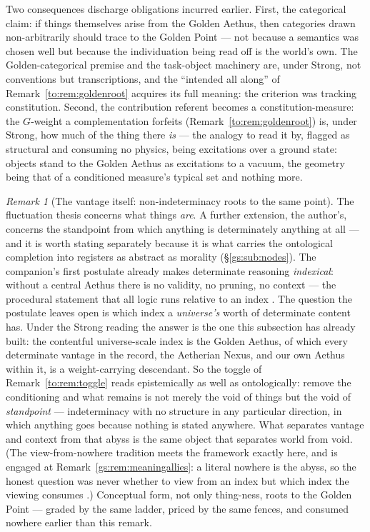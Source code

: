 \documentclass[11pt]{article}
\numberwithin{equation}{section}
\theoremstyle{plain}
\theoremstyle{definition}
\theoremstyle{remark}
\newtheorem{remark}[theorem]{Remark}
\begin{document}
Two consequences discharge obligations incurred earlier. First, the
categorical claim: if things themselves arise from the Golden Aethus,
then categories drawn non-arbitrarily should trace to the Golden Point
--- not because a semantics was chosen well but because the
individuation being read off is the world's own. The
Golden-categorical premise and the task-object machinery are, under
Strong, not conventions but transcriptions, and the ``intended all
along'' of Remark~\ref{to:rem:goldenroot} acquires its full meaning:
the criterion was tracking constitution. Second, the contribution
referent becomes a constitution-measure: the $G$-weight a
complementation forfeits (Remark~\ref{to:rem:goldenroot}) is, under
Strong, how much of the thing there \emph{is} --- the analogy to read
it by, flagged as structural and consuming no physics, being
excitations over a ground state: objects stand to the Golden Aethus as
excitations to a vacuum, the geometry being that of a conditioned
measure's typical set and nothing more.

\begin{remark}[The vantage itself: non-indeterminacy roots to the same
point]\label{to:rem:vantage}
The fluctuation thesis concerns what things \emph{are}. A further
extension, the author's, concerns the standpoint from which anything is
determinately anything at all --- and it is worth stating separately
because it is what carries the ontological completion into registers as
abstract as morality (\S\ref{gs:sub:nodes}). The companion's first
postulate already makes determinate reasoning \emph{indexical}: without
a central Aethus there is no validity, no pruning, no context --- the
procedural statement that all logic runs relative to an index
\cite{Aethus}. The question the postulate leaves open is which index a
\emph{universe's} worth of determinate content has. Under the Strong
reading the answer is the one this subsection has already built: the
contentful universe-scale index is the Golden Aethus, of which every
determinate vantage in the record, the Aetherian Nexus, and our own
Aethus within it, is a weight-carrying descendant. So the toggle of
Remark~\ref{to:rem:toggle} reads epistemically as well as
ontologically: remove the conditioning and what remains is not merely
the void of things but the void of \emph{standpoint} --- indeterminacy
with no structure in any particular direction, in which anything goes
because nothing is stated anywhere. What separates vantage and context
from that abyss is the same object that separates world from void. (The
view-from-nowhere tradition meets the framework exactly here, and is
engaged at Remark~\ref{gs:rem:meaningallies}: a literal nowhere is
the abyss, so the honest question was never whether to view from an
index but which index the viewing consumes \cite{Nagel71}.)
Conceptual form, not only thing-ness, roots to the Golden Point ---
graded by the same ladder, priced by the same fences, and consumed
nowhere earlier than this remark.
\end{remark}
\end{document}

